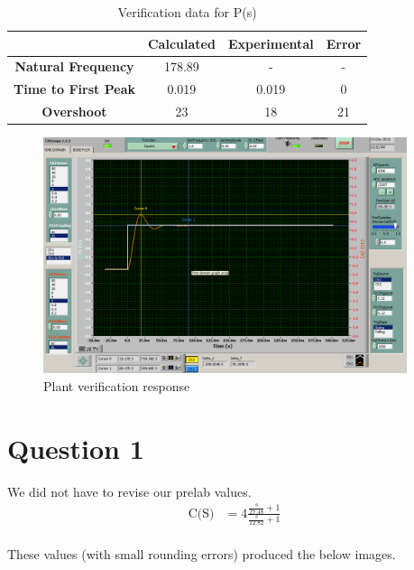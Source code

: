 \documentclass{article}
\begin{document}



\begin{table}[!htbp]
\centering
    \begin{tabular}{|c|c|c|c|}
        \hline
        &  Calculated & Experimental & Error \\
        \hline
        \textbf{Natural Frequency} & 178.89 & - & -\\
        \hline
        \textbf{Time to First Peak} & 0.019 & 0.019 & 0\\
        \hline
        \textbf{Overshoot} & 23 & 18 & 21\\
        \hline
    \end{tabular}
    \caption{Verification data for P(s)}
\end{table}

\begin{figure}[!htbp]
    \centering
    \includegraphics[width=0.95\textwidth]{plant_step.png}
    \caption{Plant verification response}
\end{figure}

\newpage
\section{Question 1} %
\label{sec:question_1}
We did not have to revise our prelab values.
\begin{align*}
\text{C(S)} &= 4\frac{\frac{s}{27.48} + 1}{\frac{s}{12.82} + 1}\\
\end{align*}

These values (with small rounding errors) produced the below images.
\end{document}
